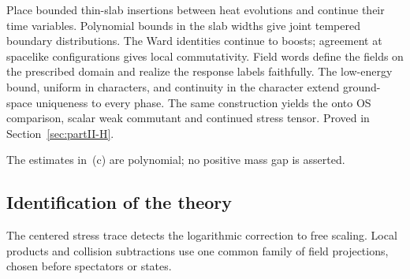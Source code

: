 Place bounded thin-slab insertions between heat evolutions and continue their
time variables. Polynomial bounds in the slab widths give joint tempered
boundary distributions. The Ward identities continue to boosts; agreement at
spacelike configurations gives local commutativity. Field words define the
fields on the prescribed domain and realize the response labels faithfully.
The low-energy bound, uniform in characters, and continuity in the character
extend ground-space uniqueness to every phase. The same construction yields
the onto OS comparison, scalar weak commutant and continued stress tensor.
Proved in Section~\ref{sec:partII-H}.

\begin{remark}
The estimates in~\textup{(c)} are polynomial; no positive mass gap is asserted.
\end{remark}

\subsection{Identification of the theory}

The centered stress trace detects the logarithmic correction to free scaling.
Local products and collision subtractions use one common family of field
projections, chosen before spectators or states.

